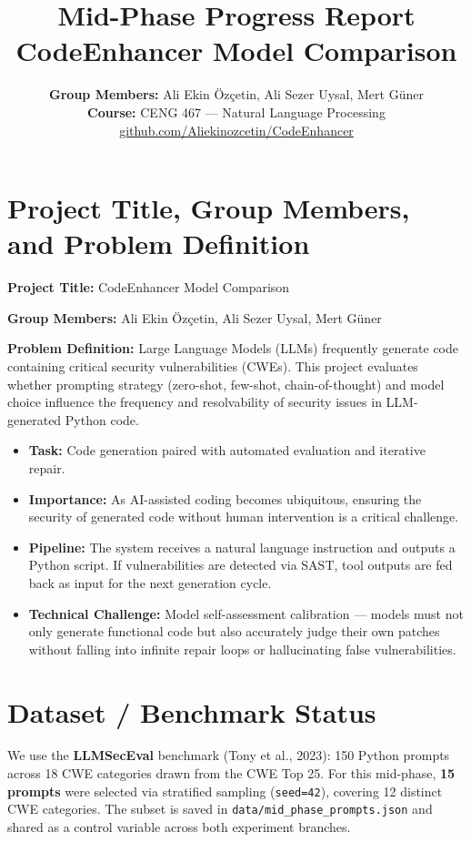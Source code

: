 \documentclass[11pt,a4paper]{article}
\title{\textbf{Mid-Phase Progress Report} \\ \large CodeEnhancer Model Comparison}
\author{
    \normalsize \textbf{Group Members:} Ali Ekin Özçetin, Ali Sezer Uysal, Mert Güner \\
    \normalsize \textbf{Course:} CENG 467 — Natural Language Processing \\
    \normalsize \href{https://github.com/Aliekinozcetin/CodeEnhancer}{github.com/Aliekinozcetin/CodeEnhancer}
}
\date{}
\begin{document}
\maketitle

\section{Project Title, Group Members, and Problem Definition}

\textbf{Project Title:} CodeEnhancer Model Comparison

\textbf{Group Members:} Ali Ekin Özçetin, Ali Sezer Uysal, Mert Güner

\textbf{Problem Definition:} Large Language Models (LLMs) frequently generate code containing critical security vulnerabilities (CWEs). This project evaluates whether prompting strategy (zero-shot, few-shot, chain-of-thought) and model choice influence the frequency and resolvability of security issues in LLM-generated Python code.

\begin{itemize}[noitemsep]
    \item \textbf{Task:} Code generation paired with automated evaluation and iterative repair.
    \item \textbf{Importance:} As AI-assisted coding becomes ubiquitous, ensuring the security of generated code without human intervention is a critical challenge.
    \item \textbf{Pipeline:} The system receives a natural language instruction and outputs a Python script. If vulnerabilities are detected via SAST, tool outputs are fed back as input for the next generation cycle.
    \item \textbf{Technical Challenge:} Model self-assessment calibration — models must not only generate functional code but also accurately judge their own patches without falling into infinite repair loops or hallucinating false vulnerabilities.
\end{itemize}

\section{Dataset / Benchmark Status}

We use the \textbf{LLMSecEval} benchmark (Tony et al., 2023): 150 Python prompts across 18 CWE categories drawn from the CWE Top 25. For this mid-phase, \textbf{15 prompts} were selected via stratified sampling (\texttt{seed=42}), covering 12 distinct CWE categories. The subset is saved in \texttt{data/mid\_phase\_prompts.json} and shared as a control variable across both experiment branches.
\end{document}
